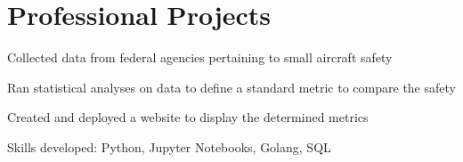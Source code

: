 \documentclass[letterpaper]{resume}
\begin{document}
\author{Sarah F. Majors}
\maketitle

%

\section{Professional Projects}
\begin{compactitem}
\item Collected data from federal agencies pertaining to small aircraft safety
\item Ran statistical analyses on data to define a standard metric to compare the safety
\item Created and deployed a website to display the determined metrics
\item Skills developed: Python, Jupyter Notebooks, Golang, SQL
\end{compactitem}
\end{document}
